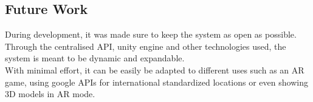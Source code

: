 \subsection{Future Work}
During development, it was made sure to keep the system as open as possible. Through the 
centralised API, unity engine and other technologies used, the system is meant to be dynamic and 
expandable.\\
With minimal effort, it can be easily be adapted to different uses such as an AR game, 
using google APIs for international standardized locations or even showing 3D models in AR mode. 

